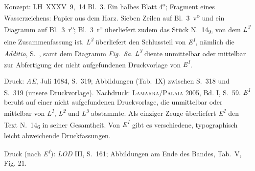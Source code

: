\begin{ledgroupsized}[r]{114mm}
\footnotesize
\pstart \parindent -6mm
%
Konzept: LH~XXXV~9,~14 Bl.~3.
Ein halbes Blatt 4\textsuperscript{o}; %
Fragment eines Wasserzeichens: Papier aus dem Harz.
Sieben Zeilen auf Bl.~3~v\textsuperscript{o}\! und ein Diagramm auf Bl.~3~r\textsuperscript{o};
Bl.~3~r\textsuperscript{o}\! überliefert zudem das Stück N.~14\textsubscript{9}, %
von dem 
\textit{L\textsuperscript{3}} eine Zusammenfassung ist.
\textit{L\textsuperscript{3}} überliefert den Schlussteil von \textit{E\textsuperscript{1}}, %
nämlich die \textit{Additio}, S.~, samt dem Diagramm \lbrack\textit{Fig.~8a}\rbrack.
\textit{L\textsuperscript{3}} diente unmittelbar oder mittelbar zur Abfertigung der nicht aufgefundenen Druckvorlage von \textit{E\textsuperscript{1}}.%
%
\pend
\end{ledgroupsized}
%
\begin{ledgroupsized}[r]{114mm}
\footnotesize
\pstart
\parindent -6mm
%
Druck: %
\cite{01041}\textit{AE},
Juli 1684, S.~319;
Abbildungen (Tab.~IX) zwischen S.~318 und S.~319
(unsere Druckvorlage).
Nachdruck: \textsc{Lamarra/Palaia} 2005, Bd. I, S.~59.\cite{01289}
\textit{E\textsuperscript{1}} beruht auf einer nicht aufgefundenen Druckvorlage, die unmittelbar oder mittelbar von \textit{L\textsuperscript{1}}, \textit{L\textsuperscript{2}} und \textit{L\textsuperscript{3}} abstammte.
Als einziger Zeuge überliefert \textit{E\textsuperscript{1}} den Text N.~14\textsubscript{6} in seiner Gesamtheit.
Von \textit{E\textsuperscript{1}} gibt es verschiedene, typographisch leicht abweichende Druckfassungen.
%
\pend%
\end{ledgroupsized}
%
\begin{ledgroupsized}[r]{114mm}
\footnotesize 
\pstart \parindent -6mm
%
Druck (nach \textit{E\textsuperscript{1}}): \textit{LOD} III, S.~161\cite{00150}; Abbildungen am Ende des Bandes, Tab.~V, Fig. 21.\cite{00150}
\pend
\end{ledgroupsized}
